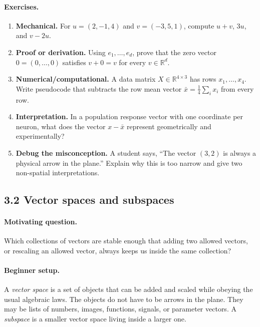 \paragraph{Exercises.}
\begin{enumerate}[label=\textbf{3.1.\arabic*.}, leftmargin=*]
\item \textbf{Mechanical.} For \(u=(2,-1,4)\) and \(v=(-3,5,1)\), compute \(u+v\), \(3u\), and \(v-2u\).
\item \textbf{Proof or derivation.} Using \(e_1,\dots,e_d\), prove that the zero vector \(0=(0,\dots,0)\) satisfies \(v+0=v\) for every \(v\in\mathbb{R}^d\).
\item \textbf{Numerical/computational.} A data matrix \(X\in\mathbb{R}^{4\times 3}\) has rows \(x_1,\dots,x_4\). Write pseudocode that subtracts the row mean vector \(\bar x=\frac14\sum_i x_i\) from every row.
\item \textbf{Interpretation.} In a population response vector with one coordinate per neuron, what does the vector \(x-\bar x\) represent geometrically and experimentally?
\item \textbf{Debug the misconception.} A student says, ``The vector \((3,2)\) is always a physical arrow in the plane.'' Explain why this is too narrow and give two non-spatial interpretations.
\end{enumerate}

\subsection{3.2 Vector spaces and subspaces}

\paragraph{Motivating question.}
Which collections of vectors are stable enough that adding two allowed vectors, or rescaling an allowed vector, always keeps us inside the same collection?

\paragraph{Beginner setup.}
A \emph{vector space} is a set of objects that can be added and scaled while obeying the usual algebraic laws. The objects do not have to be arrows in the plane. They may be lists of numbers, images, functions, signals, or parameter vectors. A \emph{subspace} is a smaller vector space living inside a larger one.

